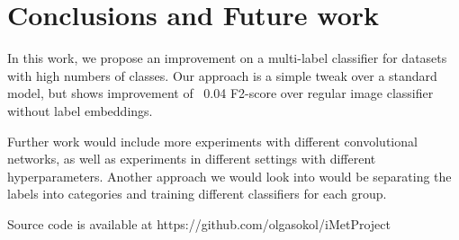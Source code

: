 \documentclass[10pt,twocolumn,letterpaper]{article}
\begin{document}
\section{Conclusions and Future work}
In this work, we propose an improvement on a multi-label classifier for datasets with high numbers of classes. Our approach is a simple tweak over a standard model, but shows improvement of ~0.04 F2-score over regular image classifier without label embeddings.
\par
Further work would include more experiments with different convolutional networks, as well as experiments in different settings with different hyperparameters. Another approach we would look into would be separating the labels into categories and training different classifiers for each group.\par
Source code is available at https://github.com/olgasokol/iMetProject
\FloatBarrier
\end{document}
